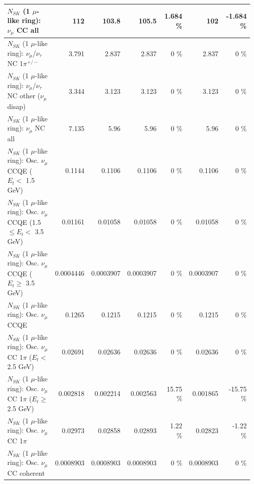 \begin{table}
\begin{tabular}{| l | r | r | r  r | r  r |}
                                $N_{SK}$ (1 $\mu$-like ring): $\nu_{\mu}$ CC all &             112 &           103.8 &           105.5 &    1.684 \%  &             102 &   -1.684 \%  \\ 
\hline
              $N_{SK}$ (1 $\mu$-like ring): $\nu_\mu$/$\nu_\tau$ NC 1$\pi^{+/-}$ &           3.791 &           2.837 &           2.837 &        0 \%  &           2.837 &        0 \%  \\ 
   $N_{SK}$ (1 $\mu$-like ring): $\nu_\mu$/$\nu_\tau$ NC other ($\nu_\mu$ disap) &           3.344 &           3.123 &           3.123 &        0 \%  &           3.123 &        0 \%  \\ 
                                $N_{SK}$ (1 $\mu$-like ring): $\nu_{\mu}$ NC all &           7.135 &            5.96 &            5.96 &        0 \%  &            5.96 &        0 \%  \\ 
\hline
\hline
           $N_{SK}$ (1 $\mu$-like ring): Osc. $\nu_\mu$ CCQE ($E_{t} <$ 1.5 GeV) &          0.1144 &          0.1106 &          0.1106 &        0 \%  &          0.1106 &        0 \%  \\ 
  $N_{SK}$ (1 $\mu$-like ring): Osc. $\nu_\mu$ CCQE (1.5 $\leq E_{t} <$ 3.5 GeV) &         0.01161 &         0.01058 &         0.01058 &        0 \%  &         0.01058 &        0 \%  \\ 
        $N_{SK}$ (1 $\mu$-like ring): Osc. $\nu_\mu$ CCQE ($E_{t} \geq$ 3.5 GeV) &       0.0004446 &       0.0003907 &       0.0003907 &        0 \%  &       0.0003907 &        0 \%  \\ 
\hline
                               $N_{SK}$ (1 $\mu$-like ring): Osc. $\nu_\mu$ CCQE &          0.1265 &          0.1215 &          0.1215 &        0 \%  &          0.1215 &        0 \%  \\ 
\hline
      $N_{SK}$ (1 $\mu$-like ring): Osc. $\nu_\mu$ CC 1$\pi$ ($E_{t} <$ 2.5 GeV) &         0.02691 &         0.02636 &         0.02636 &        0 \%  &         0.02636 &        0 \%  \\ 
   $N_{SK}$ (1 $\mu$-like ring): Osc. $\nu_\mu$ CC 1$\pi$ ($E_{t} \geq$ 2.5 GeV) &        0.002818 &        0.002214 &        0.002563 &    15.75 \%  &        0.001865 &   -15.75 \%  \\ 
\hline
                          $N_{SK}$ (1 $\mu$-like ring): Osc. $\nu_\mu$ CC 1$\pi$ &         0.02973 &         0.02858 &         0.02893 &     1.22 \%  &         0.02823 &    -1.22 \%  \\ 
                        $N_{SK}$ (1 $\mu$-like ring): Osc. $\nu_\mu$ CC coherent &       0.0008903 &       0.0008903 &       0.0008903 &        0 \%  &       0.0008903 &        0 \%  \\ 

\end{tabular}
\end{table}
